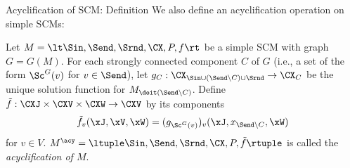 \begin{frame}{Acyclification of SCM: Definition}
  We also define an acyclification operation on simple SCMs:
  \begin{Def}
  Let $M = \lt \Sin, \Send, \Srnd, \CX, P, f \rt$ be a simple SCM with graph $G = G(M)$.
  For each strongly connected component $C$ of $G$ (i.e., a set of the form
  $\Sc^G(v)$ for $v \in \Send$), let
  $g_C : \CX_{\Sin \cup (\Send \setminus C) \cup \Srnd} \to \CX_C$
  be the unique solution function for $M_{\doit(\Send \setminus C)}$.
  Define $\tilde{f} : \CXJ \times \CXV \times \CXW \to \CXV$ by its components
  $$\tilde{f}_v(\xJ,\xV,\xW) = (g_{\Sc^G(v)})_v(\xJ,x_{\Send\setminus C},\xW)$$
  for $v \in V$.
  $M^\acy = \ltuple \Sin, \Send, \Srnd, \CX, P, \tilde{f} \rtuple$ is called the
  \emph{acyclification of $M$}.
\end{Def}
\end{frame}

